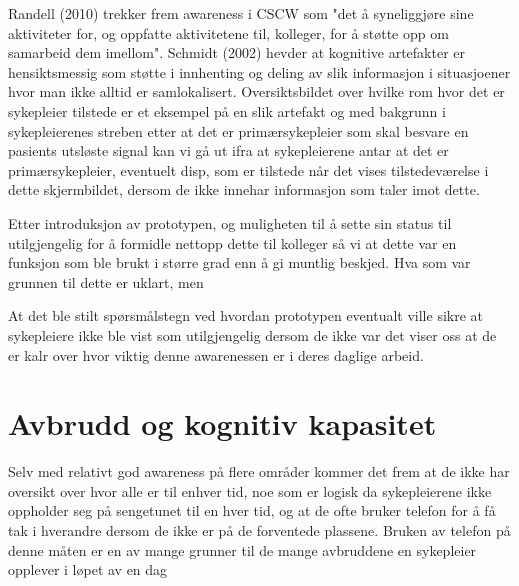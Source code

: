 \noindent
Randell (2010) trekker frem awareness i CSCW som "det å syneliggjøre sine aktiviteter for, og oppfatte aktivitetene til, kolleger, for å støtte opp om samarbeid dem imellom". Schmidt (2002) hevder at kognitive artefakter er hensiktsmessig som støtte i innhenting og deling av slik informasjon i situasjoener hvor man ikke alltid er samlokalisert. Oversiktsbildet over hvilke rom hvor det er sykepleier tilstede er et eksempel på en slik artefakt og med bakgrunn i sykepleierenes streben etter at det er primærsykepleier som skal besvare en pasients utsløste signal kan vi gå ut ifra at sykepleierene antar at det er primærsykepleier, eventuelt disp, som er tilstede når det vises tilstedeværelse i dette skjermbildet, dersom de ikke innehar informasjon som taler imot dette.

Etter introduksjon av prototypen, og muligheten til å sette sin status til utilgjengelig
for å formidle nettopp dette til kolleger så vi at dette var en funksjon som ble brukt
i større grad enn å gi muntlig beskjed. Hva som var grunnen til dette er uklart, men 

\noindent
At det ble stilt spørsmålstegn ved hvordan prototypen eventualt ville sikre at sykepleiere ikke ble vist som utilgjengelig dersom de ikke var det viser oss at de er kalr over hvor viktig denne awarenessen er i deres daglige arbeid. 


\section{Avbrudd og kognitiv kapasitet}
\noindent
Selv med relativt god awareness på flere områder kommer det frem at de ikke har oversikt over hvor alle er til enhver tid, noe som er logisk da sykepleierene ikke oppholder seg på sengetunet til en hver tid, og at de ofte bruker telefon for å få tak i hverandre dersom de ikke er på de forventede plassene. Bruken av telefon på denne måten er en av mange grunner til de mange avbruddene en sykepleier opplever i løpet av en dag 
